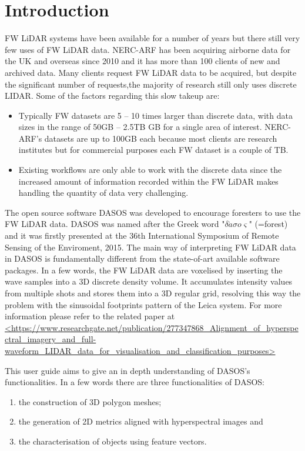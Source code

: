 \documentclass{subfiles}
\begin{document}
		

	\section{Introduction} \label{DASOS_Introduction}
	
	\par FW LiDAR systems have been available for a number of years but there still very few uses of FW LiDAR data. NERC-ARF has been acquiring airborne data for the UK and overseas since 2010 and it has more than 100 clients of new and archived data. Many clients request FW LiDAR data to be acquired, but despite the significant number of requests,the majority of research still only uses discrete LIDAR. Some of the factors regarding this slow takeup are:
	\begin{itemize}
		\item Typically FW datasets are 5 – 10 times larger than discrete data, with data sizes in the range of 50GB – 2.5TB GB for a single area of interest. NERC-ARF's datasets are up to 100GB each because most clients are research institutes but for commercial purposes each FW dataset is a couple of TB.
		\item Existing workflows are only able to work with the discrete data since the increased amount of information recorded within the FW LiDAR makes handling the quantity of data very challenging.
	\end{itemize}
	
	\par The open source software DASOS was developed to encourage foresters to use the FW LiDAR data. DASOS was named after the Greek word "$\delta\acute{a}\sigma o\varsigma$" (=forest) and it was firstly presented at the 36th International Symposium of Remote Sensing of the Enviroment, 2015. The main way of interpreting FW LiDAR data in DASOS is fundamentally different from the state-of-art available software packages. In a few words, the FW LiDAR data are voxelised by inserting the wave samples into a 3D discrete density volume. It accumulates intensity values from multiple shots and stores them into a 3D regular grid, resolving this way the problem with the sinusoidal footprints pattern of the Leica system. For more information please refer to the related paper at \url{<https://www.researchgate.net/publication/277347868_Alignment_of_hyperspectral_imagery_and_full-waveform_LIDAR_data_for_visualisation_and_classification_purposes>}
	
	\par This user guide aims to give an in depth understanding of DASOS's functionalities. In a few words there are three functionalities of DASOS: 
	\begin{enumerate}
		\item the construction of 3D polygon meshes; 
		\item the generation of 2D metrics aligned with hyperspectral images and
		\item the characterisation of objects using feature vectors. 
	\end{enumerate}
	
\end{document}
